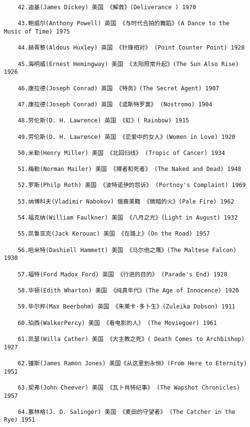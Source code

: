 \documentclass[UTF8]{../../RepresentationUniverse}
\begin{document}
\begin{lstlisting}
    42.迪基(James Dickey) 美国 《解救》(Deliverance ) 1970
    
    43.鲍威尔(Anthony Powell) 英国 《与时代合拍的舞蹈》(A Dance to the Music of Time) 1975
    
    44.赫胥黎(Aldous Huxley) 英国 《针锋相对》 (Point Counter Point) 1928
    
    45.海明威(Ernest Hemingway) 美国 《太阳照常升起》(The Sun Also Rise) 1926
    
    46.康拉德(Joseph Conrad) 英国 《特务》(The Secret Agent) 1907
    
    47.康拉德(Joseph Conrad) 英国 《诺斯特罗莫》 (Nostromo) 1904
    
    48.劳伦斯(D. H. Lawrence) 英国 《虹》( Rainbow) 1915
    
    49.劳伦斯(D. H. Lawrence) 英国 《恋爱中的女人》(Women in Love) 1920
    
    50.米勒(Henry Miller) 美国 《北回归线》 (Tropic of Cancer) 1934
    
    51.梅勒(Norman Mailer) 美国 《裸者和死者》 (The Naked and Dead) 1948
    
    52.罗斯(Philp Roth) 美国 《波特诺伊的怨诉》 (Portnoy's Complaint) 1969
    
    53.纳博科夫(Vladimir Nabokov) 俄裔美籍 《微暗的火》(Pale Fire) 1962
    
    54.福克纳(William Faulkner) 美国 《八月之光》(Light in August) 1932
    
    55.凯鲁亚克(Jack Kerouac) 美国 《在路上》(On the Road) 1957
    
    56.哈米特(Dashiell Hammett) 美国 《马尔他之鹰》(The Maltese Falcon) 1930
    
    57.福特(Ford Madox Ford) 英国 《行进的目的》 (Parade's End) 1928
    
    58.华顿(Edith Wharton) 美国 《纯真年代》(The Age of Innocence) 1920
    
    59.毕尔邦(Max Beerbohm) 英国 《朱莱卡·多卜生》(Zuleika Dobson) 1911
    
    60.珀西(WalkerPercy) 美国 《看电影的人》 (The Moviegoer) 1961
    
    61.凯瑟(Willa Cather) 美国 《大主教之死》( Death Comes to Archbishop) 1927
    
    62.锺斯(James Ramon Jones) 美国《从这里到永恒》(From Here to Eternity) 1951
    
    63.契弗(John Cheever) 美国 《瓦卜肖特纪事》 (The Wapshot Chronicles) 1957
    
    64.塞林格(J. D. Salinger) 美国 《麦田的守望者》 (The Catcher in the Rye) 1951
    

\end{lstlisting}
\end{document}

